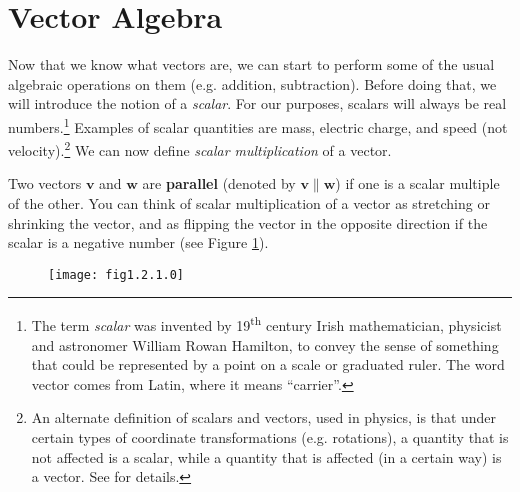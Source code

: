 \section{Vector Algebra}
Now that we know what vectors are, we can start to perform some of the usual algebraic operations on them (e.g.
addition, subtraction). Before doing that, we will introduce the notion of a \emph{scalar}.
For our purposes, scalars will always be real numbers.\footnote{The term \emph{scalar} was invented by
19\textsuperscript{th} century
Irish mathematician, physicist and astronomer William Rowan Hamilton, to convey the sense of something
that could be represented by a point
on a scale or graduated ruler. The word vector comes from Latin, where it means ``carrier''.} Examples of
scalar quantities are mass, electric charge, and speed (not velocity).\footnote{An alternate definition of
scalars and vectors, used in physics, is that under certain types of coordinate transformations (e.g. rotations), a
quantity that is not affected is a scalar, while a quantity that is affected (in a certain way) is a vector.
See \cite{mar} for details.}
We can now define \emph{scalar multiplication} of a vector.


Two vectors $\mathbf{v}$ and $\mathbf{w}$ are \textbf{parallel} (denoted by $\mathbf{v} \parallel
\mathbf{w}$) if one is a scalar multiple of the other.
You can think of scalar multiplication of a vector as stretching or shrinking
the vector, and as flipping the vector in the opposite direction if the scalar is a negative number
(see Figure \ref{fig:scalar}).

\begin{figure}[h]
 \begin{center}
  \texttt{[image: fig1.2.1.0]}
 \end{center}
 \caption[]{}
 \label{fig:scalar}
\end{figure}


